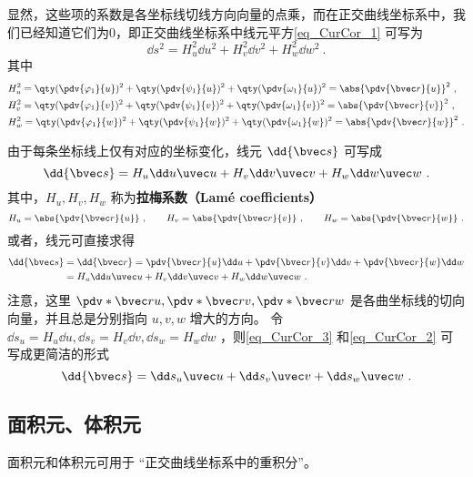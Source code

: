 显然，这些项的系数是各坐标线切线方向向量的点乘，而在正交曲线坐标系中，我们已经知道它们为0，即正交曲线坐标系中线元平方\autoref{eq_CurCor_1} 可写为
\begin{equation}
\dd s^2=H_u^2\dd u^2+H_v^2\dd v^2+H_w^2\dd w^2~.
\end{equation}
其中
\begin{equation}
\begin{aligned}
&H_u^2=\qty(\pdv{\varphi_1}{u})^2+\qty(\pdv{\psi_1}{u})^2+\qty(\pdv{\omega_1}{u})^2=\abs{\pdv{\bvec r}{u}}^2~,\\
&H_v^2=\qty(\pdv{\varphi_1}{v})^2+\qty(\pdv{\psi_1}{v})^2+\qty(\pdv{\omega_1}{v})^2=\abs{\pdv{\bvec r}{v}}^2~,\\
&H_w^2=\qty(\pdv{\varphi_1}{w})^2+\qty(\pdv{\psi_1}{w})^2+\qty(\pdv{\omega_1}{w})^2=\abs{\pdv{\bvec r}{w}}^2~.
\end{aligned}
\end{equation}

由于每条坐标线上仅有对应的坐标变化，线元 $\dd {\bvec s}$ 可写成
\begin{equation}\label{eq_CurCor_3}
\dd {\bvec s}=H_u\dd u\uvec u+H_v\dd v\uvec v+H_w\dd w\uvec w~.
\end{equation}
其中，$H_u,H_v,H_w$ 称为\textbf{拉梅系数（Lamé coefficients）}
\begin{equation}
H_u=\abs{\pdv{\bvec r}{u}}~,\qquad
H_v=\abs{\pdv{\bvec r}{v}}~,\qquad
H_w=\abs{\pdv{\bvec r}{w}}~.
\end{equation}
或者，线元可直接求得
\begin{equation}\label{eq_CurCor_2}
\begin{aligned}
\dd {\bvec s}&=\dd {\bvec r}=\pdv{\bvec r}{u}\dd u+\pdv{\bvec r}{v}\dd v+\pdv{\bvec r}{w}\dd w\\
&=H_u\dd u\uvec u+H_v\dd v\uvec v+H_w\dd w\uvec w~.
\end{aligned}
\end{equation}
注意，这里 $\pdv*{\bvec r}{u},\pdv*{\bvec r}{v},\pdv*{\bvec r}{w}$ 是各曲坐标线的切向向量，并且总是分别指向 $u,v,w$ 增大的方向。
令 $\dd s_u=H_u\dd u,\dd s_v=H_v\dd v,\dd s_w=H_w\dd w$ ，则\autoref{eq_CurCor_3} 和\autoref{eq_CurCor_2} 可写成更简洁的形式
\begin{equation}
\dd {\bvec s}=\dd s_u\uvec u+\dd s_v\uvec v+\dd s_w\uvec w~.
\end{equation}

\subsection{面积元、体积元}
面积元和体积元可用于 “正交曲线坐标系中的重积分”。

